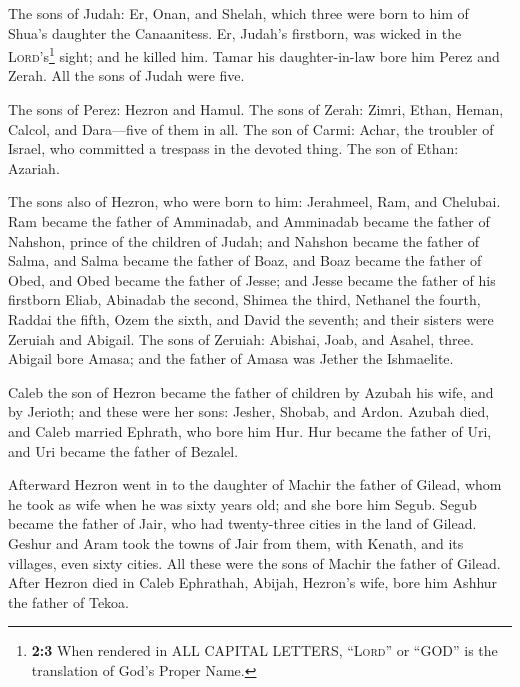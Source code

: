  The sons of Judah: Er, Onan, and Shelah, which three were
born to him of Shua's daughter the Canaanitess. Er, Judah's firstborn,
was wicked in the \textsc{Lord}'s\footnote{\textbf{2:3} When rendered in
  ALL CAPITAL LETTERS, ``\textsc{Lord}'' or ``GOD'' is the translation
  of God's Proper Name.} sight; and he killed him.  Tamar
his daughter-in-law bore him Perez and Zerah. All the sons of Judah were
five.

 The sons of Perez: Hezron and Hamul.  The
sons of Zerah: Zimri, Ethan, Heman, Calcol, and Dara---five of them in
all.  The son of Carmi: Achar, the troubler of Israel, who
committed a trespass in the devoted thing.  The son of
Ethan: Azariah.

 The sons also of Hezron, who were born to him: Jerahmeel,
Ram, and Chelubai.  Ram became the father of Amminadab,
and Amminadab became the father of Nahshon, prince of the children of
Judah;  and Nahshon became the father of Salma, and Salma
became the father of Boaz,  and Boaz became the father of
Obed, and Obed became the father of Jesse;  and Jesse
became the father of his firstborn Eliab, Abinadab the second, Shimea
the third,  Nethanel the fourth, Raddai the fifth,
 Ozem the sixth, and David the seventh; 
and their sisters were Zeruiah and Abigail. The sons of Zeruiah:
Abishai, Joab, and Asahel, three.  Abigail bore Amasa;
and the father of Amasa was Jether the Ishmaelite.

 Caleb the son of Hezron became the father of children by
Azubah his wife, and by Jerioth; and these were her sons: Jesher,
Shobab, and Ardon.  Azubah died, and Caleb married
Ephrath, who bore him Hur.  Hur became the father of Uri,
and Uri became the father of Bezalel.

 Afterward Hezron went in to the daughter of Machir the
father of Gilead, whom he took as wife when he was sixty years old; and
she bore him Segub.  Segub became the father of Jair, who
had twenty-three cities in the land of Gilead.  Geshur
and Aram took the towns of Jair from them, with Kenath, and its
villages, even sixty cities. All these were the sons of Machir the
father of Gilead.  After Hezron died in Caleb Ephrathah,
Abijah, Hezron's wife, bore him Ashhur the father of Tekoa.

